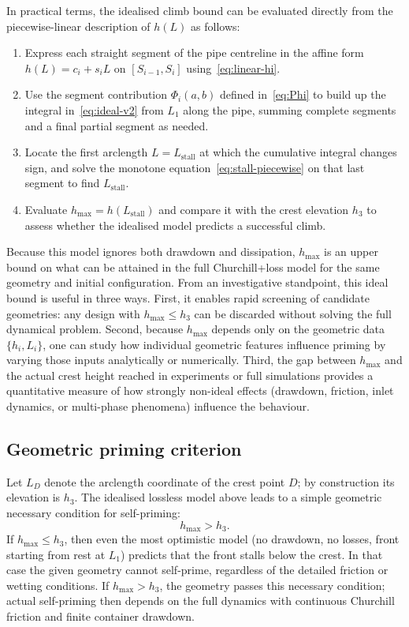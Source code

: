 \documentclass[11pt]{article}
\begin{document}
In practical terms, the idealised climb bound can be evaluated directly from the
piecewise-linear description of $h(L)$ as follows:
\begin{enumerate}
  \item Express each straight segment of the pipe centreline in the affine form
    $h(L)=c_i+s_iL$ on $[S_{i-1},S_i]$ using~\eqref{eq:linear-hi}.
  \item Use the segment contribution $\Phi_i(a,b)$ defined in~\eqref{eq:Phi} to build up the
    integral in~\eqref{eq:ideal-v2} from $L_1$ along the pipe, summing complete segments and
    a final partial segment as needed.
  \item Locate the first arclength $L=L_{\text{stall}}$ at which the cumulative integral
    changes sign, and solve the monotone equation~\eqref{eq:stall-piecewise} on that last
    segment to find $L_{\text{stall}}$.
  \item Evaluate $h_{\max} = h(L_{\text{stall}})$ and compare it with the crest elevation
    $h_3$ to assess whether the idealised model predicts a successful climb.
\end{enumerate}
Because this model ignores both drawdown and dissipation, $h_{\max}$ is an upper bound on
what can be attained in the full Churchill+loss model for the same geometry and initial
configuration.
From an investigative standpoint, this ideal bound is useful in three ways. First, it enables rapid
screening of candidate geometries: any design with $h_{\max}\le h_3$ can be discarded without
solving the full dynamical problem. Second, because $h_{\max}$ depends only on the geometric
data $\{h_i,L_i\}$, one can study how individual geometric features influence priming by
varying those inputs analytically or numerically. Third, the gap between $h_{\max}$ and the
actual crest height reached in experiments or full simulations provides a quantitative measure
of how strongly non-ideal effects (drawdown, friction, inlet dynamics, or multi-phase
phenomena) influence the behaviour.

\subsection{Geometric priming criterion}

Let $L_D$ denote the arclength coordinate of the crest point $D$; by construction its elevation is $h_3$.
The idealised lossless model above leads to a simple geometric necessary condition for
self-priming:
\begin{equation}
  h_{\max} > h_3.
\end{equation}
If $h_{\max} \le h_3$, then even the most optimistic model (no drawdown, no losses, front
starting from rest at $L_1$) predicts that the front stalls below the crest. In that case the
given geometry cannot self-prime, regardless of the detailed friction or wetting conditions.
If $h_{\max} > h_3$, the geometry passes this necessary condition; actual self-priming then
depends on the full dynamics with continuous Churchill friction and finite container
drawdown.
\end{document}
